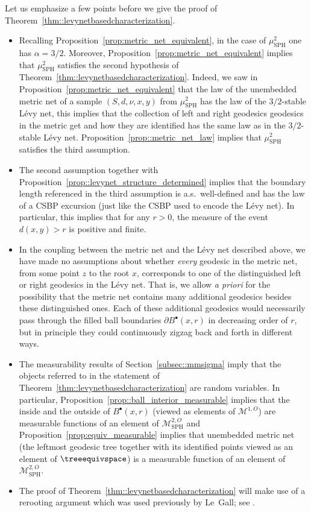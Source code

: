 \documentclass[JEP,XML,SOM,Unicode]{cedram}
\let\mathcal\mathscr
\newcommand{\sbullet}{{\scriptscriptstyle\bullet}}
\let\oldS\S
\theoremstyle{plain}
\numberwithin{theorem}{section}
\theoremstyle{definition}
\newcommand\gmsspace{{\mathcal M}_{\mathrm{SPH}}}
\newcommand\mmspace{{\mathcal M}}
\renewcommand{\S}{{\mathbf S}}
\newcommand{\mustwo}{\mu_{\mathrm{SPH}}^2}
\newcommand{\fb}[2]{B^\sbullet(#1,#2)}
\begin{document}
Let us emphasize a few points before we give the proof of Theorem~\ref{thm::levynetbasedcharacterization}.
\begin{itemize}
\item Recalling Proposition~\ref{prop:metric_net_equivalent}, in the case of $\mustwo$ one has $\alpha=3/2$. Moreover, Proposition~\ref{prop:metric_net_equivalent} implies that $\mustwo$ satisfies the second hypothesis of Theorem~\ref{thm::levynetbasedcharacterization}. Indeed, we saw in Proposition~\ref{prop:metric_net_equivalent} that the law of the unembedded metric net of a sample $(S,d,\nu,x,y)$ from $\mustwo$ has the law of the $3/2$-stable Lévy net, this implies that the collection of left and right geodesics geodesics in the metric get and how they are identified has the same law as in the $3/2$-stable Lévy net. Proposition~\ref{prop::metric_net_law} implies that $\mustwo$ satisfies the third assumption.
\item The second assumption together with Proposition~\ref{prop::levynet_structure_determined} implies that the boundary length referenced in the third assumption is a.s.\ well-defined and has the law of a CSBP excursion (just like the CSBP used to encode the Lévy net). In particular, this implies that for any $r>0$, the measure of the event $d(x,y)>r$ is positive and finite.
\item In the coupling between the metric net and the Lévy net described above, we have made no assumptions about whether \emph{every} geodesic in the metric net, from some point $z$ to the root $x$, corresponds to one of the distinguished left or right geodesics in the Lévy net. That is, we allow \emph{a priori} for the possibility that the metric net contains many additional geodesics besides these distinguished ones. Each of these additional geodesics would necessarily pass through the filled ball boundaries $\partial \fb{x}{r}$ in decreasing order of $r$, but in principle they could continuously zigzag back and forth in different ways.
\item The measurability results of Section~\ref{subsec::mmsigma} imply that the objects referred to in the statement of Theorem~\ref{thm::levynetbasedcharacterization} are random variables. In particular, Proposition~\ref{prop::ball_interior_measurable} implies that the inside and the outside of $\fb{x}{r}$ (viewed as elements of $\mmspace^{1,O}$) are measurable functions of an element of $\gmsspace^{2,O}$ and Proposition~\ref{prop:equiv_measurable} implies that unembedded metric net (\ie the leftmost geodesic tree together with its identified points viewed as an element of $\treeequivspace$) is a measurable function of an element of $\gmsspace^{2,O}$.
\item The proof of Theorem~\ref{thm::levynetbasedcharacterization} will make use of a rerooting argument which was used previously by Le~Gall; see \cite[\oldS 8.3]{legalluniqueanduniversal}.
\end{itemize}
\end{document}
